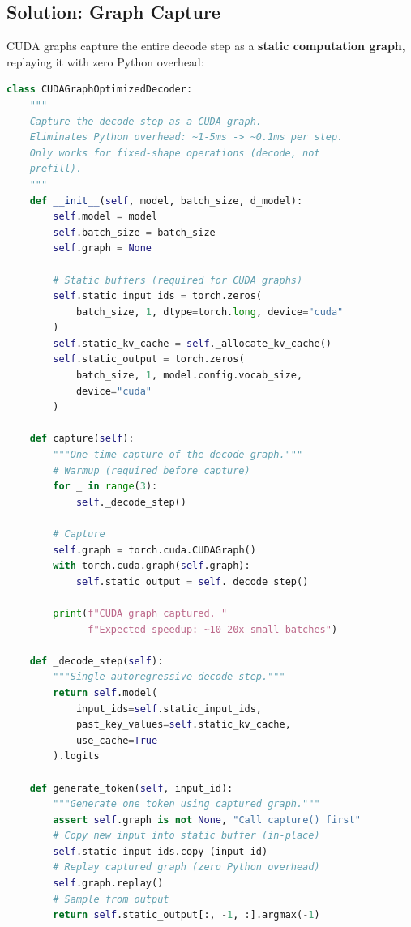 \documentclass[11pt,a4paper]{article}
\begin{document}
\subsection{Solution: Graph Capture}

CUDA graphs capture the entire decode step as a \textbf{static computation graph}, replaying it with zero Python overhead:

\begin{lstlisting}[language=Python, caption={CUDA Graph Optimized Decoder}]
class CUDAGraphOptimizedDecoder:
    """
    Capture the decode step as a CUDA graph.
    Eliminates Python overhead: ~1-5ms -> ~0.1ms per step.
    Only works for fixed-shape operations (decode, not
    prefill).
    """
    def __init__(self, model, batch_size, d_model):
        self.model = model
        self.batch_size = batch_size
        self.graph = None
        
        # Static buffers (required for CUDA graphs)
        self.static_input_ids = torch.zeros(
            batch_size, 1, dtype=torch.long, device="cuda"
        )
        self.static_kv_cache = self._allocate_kv_cache()
        self.static_output = torch.zeros(
            batch_size, 1, model.config.vocab_size,
            device="cuda"
        )
    
    def capture(self):
        """One-time capture of the decode graph."""
        # Warmup (required before capture)
        for _ in range(3):
            self._decode_step()
        
        # Capture
        self.graph = torch.cuda.CUDAGraph()
        with torch.cuda.graph(self.graph):
            self.static_output = self._decode_step()
        
        print(f"CUDA graph captured. "
              f"Expected speedup: ~10-20x small batches")
    
    def _decode_step(self):
        """Single autoregressive decode step."""
        return self.model(
            input_ids=self.static_input_ids,
            past_key_values=self.static_kv_cache,
            use_cache=True
        ).logits
    
    def generate_token(self, input_id):
        """Generate one token using captured graph."""
        assert self.graph is not None, "Call capture() first"
        # Copy new input into static buffer (in-place)
        self.static_input_ids.copy_(input_id)
        # Replay captured graph (zero Python overhead)
        self.graph.replay()
        # Sample from output
        return self.static_output[:, -1, :].argmax(-1)
\end{lstlisting}
\end{document}
